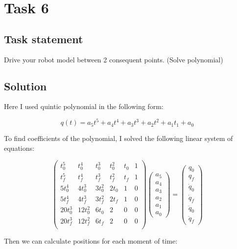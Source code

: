 \section*{Task 6}

\subsection*{Task statement}

Drive your robot model between 2 consequent points. (Solve polynomial)

\subsection*{Solution}

Here I used quintic polynomial in the following form:

$$q(t) = a_5 t^5 + a_4 t^4 + a_3 t^3 + a_2 t^2 + a_1 t_1 + a_0$$

To find coefficients of the polynomial, I solved the following linear system of equations:

$$
\begin{pmatrix}
    t_0^5 & t_0^4 & t_0^3 & t_0^2 & t_0 & 1 \\
    t_f^5 & t_f^4 & t_f^3 & t_f^2 & t_f & 1 \\
    5t_0^4 & 4t_0^3 & 3t_0^2 & 2t_0 & 1 & 0 \\
    5t_f^4 & 4t_f^3 & 3t_f^2 & 2t_f & 1 & 0 \\
    20t_0^3 & 12t_0^2 & 6t_0 & 2 & 0 & 0 \\
    20t_f^3 & 12t_f^2 & 6t_f & 2 & 0 & 0 \\
\end{pmatrix}
\begin{pmatrix}
    a_5 \\ a_4 \\ a_3 \\ a_2 \\ a_1 \\ a_0
\end{pmatrix}
=
\begin{pmatrix}
    q_0 \\
    q_f \\
    \dot q_0 \\
    \dot q_f \\
    \ddot q_0 \\
    \ddot q_f
\end{pmatrix}
$$

Then we can calculate positions for each moment of time:

